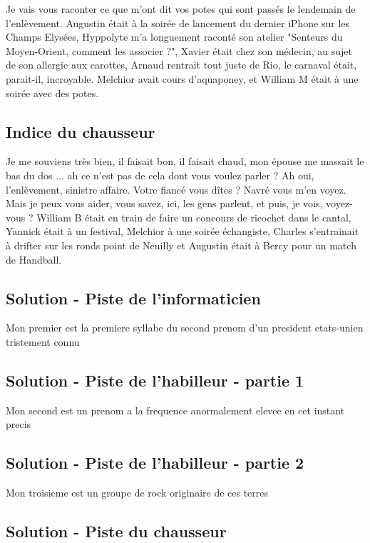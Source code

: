 \documentclass[12pt]{article}
\begin{document}
Je vais vous raconter ce que m'ont dit vos potes qui sont passés le lendemain de l'enlèvement. Augustin était à la soirée de lancement du dernier iPhone sur les Champs Elysées, Hyppolyte m'a longuement raconté son atelier "Senteurs du Moyen-Orient, comment les associer ?", Xavier était chez son médecin, au sujet de son allergie aux carottes, Arnaud rentrait tout juste de Rio, le carnaval était, parait-il, incroyable. Melchior avait cours d'aquaponey, et William M était à une soirée avec des potes. 

\subsection{Indice du chausseur}

Je me souviens très bien, il faisait bon, il faisait chaud, mon épouse me massait le bas du dos ... ah ce n'est pas de cela dont vous voulez parler ? Ah oui, l'enlèvement, sinistre affaire. Votre fiancé vous dîtes ? Navré vous m'en voyez. Mais je peux vous aider, vous savez, ici, les gens parlent, et puis, je vois, voyez-vous ?
William B était en train de faire un concours de ricochet dans le cantal, Yannick était à un festival, Melchior à une soirée échangiste, Charles s'entrainait à drifter sur les ronds point de Neuilly et Augustin était à Bercy pour un match de Handball.

\subsection{Solution - Piste de l'informaticien}

Mon premier est la premiere syllabe du second prenom d'un president etats-unien tristement connu


\subsection{Solution - Piste de l'habilleur - partie 1}

Mon second est un prenom a la frequence anormalement elevee en cet instant precis

\subsection{Solution - Piste de l'habilleur - partie 2}

Mon troisieme est un groupe de rock originaire de ces terres

\subsection{Solution - Piste du chausseur}
\end{document}
